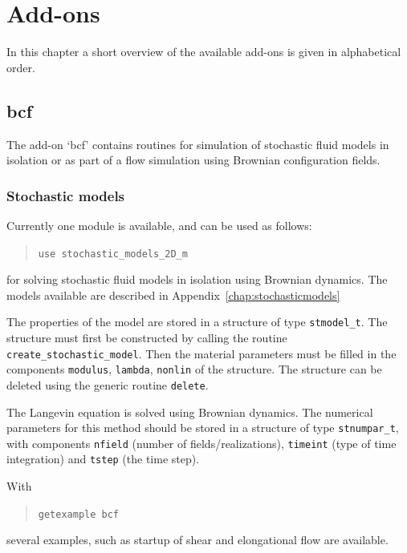 
\chapter{Add-ons}

\label{ch:addons}

\def\chaptertitle{Add-ons}
\def\headdate{11th September 2025}

In this chapter a short overview of the available add-ons is given in alphabetical order.

\section{bcf}
\label{sec:bcfaddon}

The add-on `bcf' contains routines for simulation of
stochastic fluid models in isolation or as part of a flow simulation using
Brownian configuration fields.

\subsection{Stochastic models}

Currently one module is available, and can be used as follows:
\begin{quote}
   \texttt{use stochastic\_models\_2D\_m}
\end{quote}
for solving stochastic fluid models in isolation using Brownian dynamics. The
models available are described in Appendix~\ref{chap:stochasticmodels}

The properties of the model are stored in a structure of type
\texttt{stmodel\_t}. The structure must first be constructed by calling the
routine \texttt{create\_stochastic\_model}. Then the material parameters must
be filled in the components \texttt{modulus}, \texttt{lambda}, \texttt{nonlin}
of the structure. The structure can be deleted using the generic routine
\texttt{delete}.

The Langevin equation is solved using Brownian dynamics. The numerical
parameters for this method should be stored in a structure of type
\texttt{stnumpar\_t}, with components \texttt{nfield} (number of
fields/realizations), \texttt{timeint} (type of time integration)
 and \texttt{tstep} (the time step).

With
\begin{quote}
   \texttt{getexample bcf}
\end{quote}
several examples, such as startup of shear and elongational flow are available.


